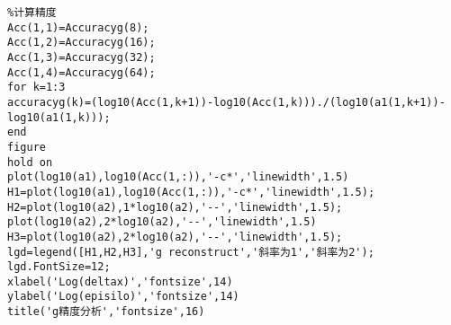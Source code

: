 \documentclass[a4paper,11pt,UTF8]{article}%
\theoremstyle{plain}
\begin{document}
\begin{lstlisting}
%计算精度
Acc(1,1)=Accuracyg(8);
Acc(1,2)=Accuracyg(16);
Acc(1,3)=Accuracyg(32);
Acc(1,4)=Accuracyg(64);
for k=1:3
accuracyg(k)=(log10(Acc(1,k+1))-log10(Acc(1,k)))./(log10(a1(1,k+1))-log10(a1(1,k)));
end
figure
hold on
plot(log10(a1),log10(Acc(1,:)),'-c*','linewidth',1.5)
H1=plot(log10(a1),log10(Acc(1,:)),'-c*','linewidth',1.5);
H2=plot(log10(a2),1*log10(a2),'--','linewidth',1.5);
plot(log10(a2),2*log10(a2),'--','linewidth',1.5)
H3=plot(log10(a2),2*log10(a2),'--','linewidth',1.5);
lgd=legend([H1,H2,H3],'g reconstruct','斜率为1','斜率为2');
lgd.FontSize=12;
xlabel('Log(deltax)','fontsize',14)
ylabel('Log(episilo)','fontsize',14)
title('g精度分析','fontsize',16)	
\end{lstlisting}
	
\end{document}
